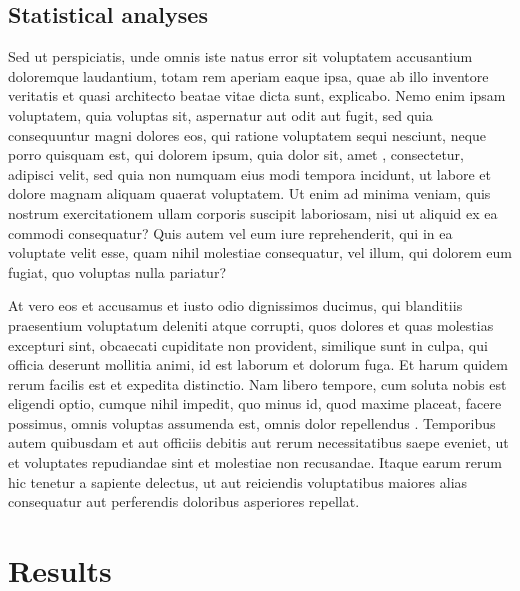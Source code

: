 \documentclass[a4paper,12pt]{article}
\begin{document}
\subsection*{Statistical analyses}

Sed ut perspiciatis, unde omnis iste natus error sit voluptatem accusantium doloremque
laudantium, totam rem aperiam eaque ipsa, quae ab illo inventore veritatis et quasi
architecto beatae vitae dicta sunt, explicabo. Nemo enim ipsam voluptatem, quia voluptas
sit, aspernatur aut odit aut fugit, sed quia consequuntur magni dolores eos, qui ratione
voluptatem sequi nesciunt, neque porro quisquam est, qui dolorem ipsum, quia dolor sit,
amet \citep{Ray_2005_Bk}, consectetur, adipisci velit, sed quia non numquam eius modi
tempora incidunt, ut labore et dolore magnam aliquam quaerat voluptatem. Ut enim ad minima
veniam, quis nostrum exercitationem ullam corporis suscipit laboriosam, nisi ut aliquid ex
ea commodi consequatur? Quis autem vel eum iure reprehenderit, qui in ea voluptate velit
esse, quam nihil molestiae consequatur, vel illum, qui dolorem eum fugiat, quo voluptas
nulla pariatur?

At vero eos et accusamus et iusto odio dignissimos ducimus, qui blanditiis praesentium
voluptatum deleniti atque corrupti, quos dolores et quas molestias excepturi sint,
obcaecati cupiditate non provident, similique sunt in culpa, qui officia deserunt mollitia
animi, id est laborum et dolorum fuga. Et harum quidem rerum facilis est et expedita
distinctio. Nam libero tempore, cum soluta nobis est eligendi optio, cumque nihil impedit,
quo minus id, quod maxime placeat, facere possimus, omnis voluptas assumenda est, omnis
dolor repellendus \citep{Gibeau_1998}. Temporibus autem quibusdam et aut officiis debitis
aut rerum necessitatibus saepe eveniet, ut et voluptates repudiandae sint et molestiae non
recusandae. Itaque earum rerum hic tenetur a sapiente delectus, ut aut reiciendis
voluptatibus maiores alias consequatur aut perferendis doloribus asperiores repellat.

\section*{Results}
\end{document}
